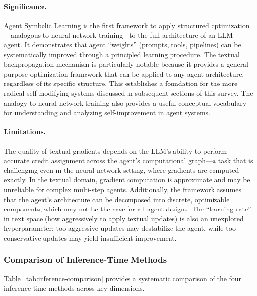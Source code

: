 \paragraph{Significance.}
Agent Symbolic Learning is the first framework to apply structured optimization---analogous to neural network training---to the full architecture of an LLM agent. It demonstrates that agent ``weights'' (prompts, tools, pipelines) can be systematically improved through a principled learning procedure. The textual backpropagation mechanism is particularly notable because it provides a general-purpose optimization framework that can be applied to any agent architecture, regardless of its specific structure. This establishes a foundation for the more radical self-modifying systems discussed in subsequent sections of this survey. The analogy to neural network training also provides a useful conceptual vocabulary for understanding and analyzing self-improvement in agent systems.

\paragraph{Limitations.}
The quality of textual gradients depends on the LLM's ability to perform accurate credit assignment across the agent's computational graph---a task that is challenging even in the neural network setting, where gradients are computed exactly. In the textual domain, gradient computation is approximate and may be unreliable for complex multi-step agents. Additionally, the framework assumes that the agent's architecture can be decomposed into discrete, optimizable components, which may not be the case for all agent designs. The ``learning rate'' in text space (how aggressively to apply textual updates) is also an unexplored hyperparameter: too aggressive updates may destabilize the agent, while too conservative updates may yield insufficient improvement.


\subsubsection{Comparison of Inference-Time Methods}

Table~\ref{tab:inference-comparison} provides a systematic comparison of the four inference-time methods across key dimensions.

